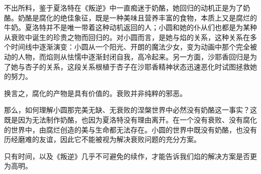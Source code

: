 不出所料，鉴于夏洛特在《叛逆》中一直痴迷于奶酪，她回归的动机正是为了奶酪。奶酪是腐化的绝佳象征，既是一种美味且营养丰富的食物，本质上又是腐烂的牛奶。夏洛特并不是唯一带着这种动机返回的人；小圆和她的仆从们也都是为某种从衰败中诞生的珍贵之物而回归的。对小圆而言，是她与焰的关系，这种关系在多个时间线中逐渐演变：小圆从一个阳光、开朗的魔法少女，变为动画中那个完全被动的人物，而焰则从怯懦中逐渐封闭自我，高冷起来。另一方面，沙耶香回归是为了她与杏子的关系，这段关系根植于杏子在沙耶香精神状态迅速恶化时试图拯救她的努力。

换言之，腐化的产物是具有价值的。衰败并非纯粹的邪恶。

那么，如何理解小圆那完美无缺、无衰败的涅槃世界中必然没有奶酪这一事实？这既是因为无法制作奶酪，也因为夏洛特没有理由离开。在一个没有衰败、没有腐化的世界中，由腐烂创造的美与生命都无法存在。小圆的世界中既没有奶酪，也没有历经磨难的友谊，因此它不能被视为解决衰败问题的充分方案。

只有时间，以及《叛逆》几乎不可避免的续作，才能告诉我们焰的解决方案是否更为高明。